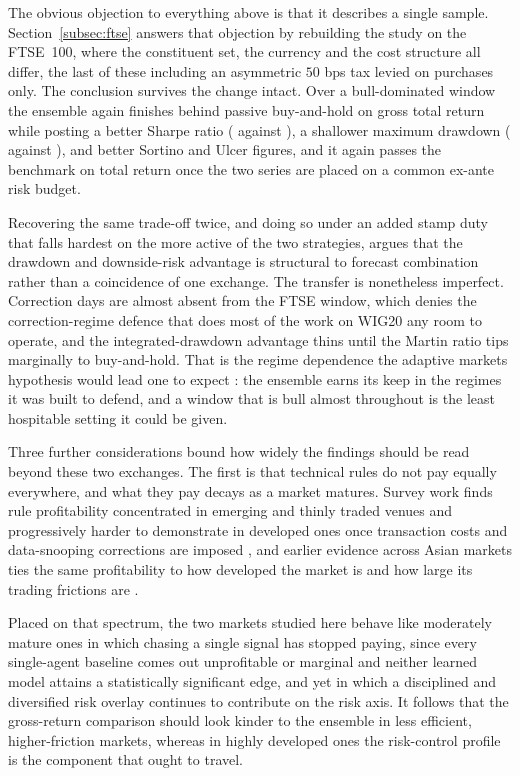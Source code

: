 The obvious objection to everything above is that it describes a single sample. Section~\ref{subsec:ftse} answers that objection by rebuilding the study on the FTSE~100, where the constituent set, the currency and the cost structure all differ, the last of these including an asymmetric $50$ bps tax levied on purchases only. The conclusion survives the change intact. Over a bull-dominated window the ensemble again finishes behind passive buy-and-hold on gross total return while posting a better Sharpe ratio (\FtseSharpe{} against \FtseBHsharpe{}), a shallower maximum drawdown (\FtseMDD{} against \FtseBHmdd{}), and better Sortino and Ulcer figures, and it again passes the benchmark on total return once the two series are placed on a common ex-ante risk budget.

Recovering the same trade-off twice, and doing so under an added stamp duty that falls hardest on the more active of the two strategies, argues that the drawdown and downside-risk advantage is structural to forecast combination rather than a coincidence of one exchange. The transfer is nonetheless imperfect. Correction days are almost absent from the FTSE window, which denies the correction-regime defence that does most of the work on WIG20 any room to operate, and the integrated-drawdown advantage thins until the Martin ratio tips marginally to buy-and-hold. That is the regime dependence the adaptive markets hypothesis would lead one to expect \cite{lo2004}: the ensemble earns its keep in the regimes it was built to defend, and a window that is bull almost throughout is the least hospitable setting it could be given.

Three further considerations bound how widely the findings should be read beyond these two exchanges. The first is that technical rules do not pay equally everywhere, and what they pay decays as a market matures. Survey work finds rule profitability concentrated in emerging and thinly traded venues and progressively harder to demonstrate in developed ones once transaction costs and data-snooping corrections are imposed \cite{parkirwin2007}, and earlier evidence across Asian markets ties the same profitability to how developed the market is and how large its trading frictions are \cite{bessembinderchan1995}.

Placed on that spectrum, the two markets studied here behave like moderately mature ones in which chasing a single signal has stopped paying, since every single-agent baseline comes out unprofitable or marginal and neither learned model attains a statistically significant edge, and yet in which a disciplined and diversified risk overlay continues to contribute on the risk axis. It follows that the gross-return comparison should look kinder to the ensemble in less efficient, higher-friction markets, whereas in highly developed ones the risk-control profile is the component that ought to travel.

